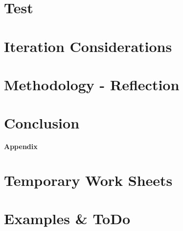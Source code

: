 \chapter{Test}
\label{chap:test}


\chapter{Iteration Considerations}
\label{chap:iteration}


\chapter{Methodology - Reflection}
\label{chap:reflectionMethodology}


\chapter{Conclusion}
\label{chap:conclusion}




\appendix	%

\clearforchapter
\begin{vplace}[0.7]
\begin{center}
\Huge \textbf{Appendix}
\end{center}
\end{vplace}



\chapter{Temporary Work Sheets}
\label{chap:temp}









\chapter{Examples \& ToDo}

\clearpage
\listoftodos
